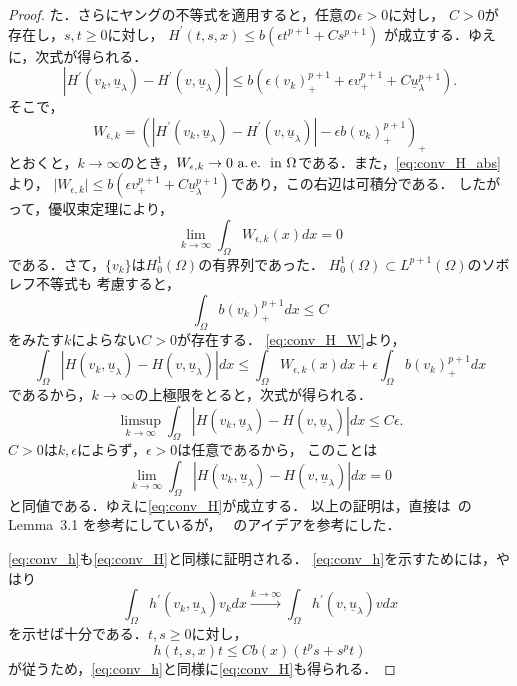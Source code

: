 \begin{proof}
 た．さらにヤングの不等式を適用すると，任意の$\epsilon > 0$に対し，
 $C > 0$が存在し，$s, t \geq 0$に対し，
 $H^\prime(t, s, x) \leq b( \epsilon t^{p+1} + C s^{p+1})$
 が成立する．ゆえに，次式が得られる．
 \begin{equation}
  \left\lvert H^\prime(v_k, \underline{u}_\lambda) - H^\prime(v,
   \underline{u}_\lambda ) \right\rvert \leq b \left( \epsilon
   (v_k)_+^{p+1}  + \epsilon v_+^{p+1} + C
   \underline{u}_\lambda^{p+1} \right). \label{eq:conv_H_abs}
 \end{equation}
 そこで，
 \begin{equation}
  W_{\epsilon, k} = \left( \left\lvert H^\prime(v_k,
                            \underline{u}_\lambda) - H^\prime(v,
                            \underline{u}_\lambda) \right\rvert
  -\epsilon b (v_k)_+^{p+1}
                    \right)_+ \label{eq:conv_H_W}
 \end{equation}
 とおくと，$k \to \infty$のとき，$W_{\epsilon, k} \to 0 ~\text{a.\,e.}~ ~\text{in}~
 \Omega$である．また，\eqref{eq:conv_H_abs}より，
 $\lvert W_{\epsilon, k} \rvert \leq b \left( \epsilon v_+^{p+1} + C
 \underline{u}_\lambda^{p+1} \right)$であり，この右辺は可積分である．
 したがって，優収束定理により，
 \[
  \lim_{k \to \infty} \int_\Omega  W_{\epsilon, k}(x) dx = 0
 \]
 である．さて，$\{v_k \}$は$H_0^1(\Omega)$の有界列であった．
 $H_0^1(\Omega) \subset L^{p+1}(\Omega)$のソボレフ不等式も
 考慮すると，
 \[
   \int_\Omega b ( v_k )_+^{p+1} dx \leq C
 \]
 をみたす$k$によらない$C > 0$が存在する．
 \eqref{eq:conv_H_W}より，
 \[
  \int_\Omega \left\lvert H(v_k, \underline{u}_\lambda) - H(v,
 \underline{u}_\lambda ) \right\rvert dx \leq \int_\Omega W_{\epsilon,
 k} (x)dx + \epsilon \int_\Omega b(v_k)_+^{p+1} dx
 \]
 であるから，$k \to \infty$の上極限をとると，次式が得られる．
 \[
 \limsup_{k \to \infty} \int_\Omega 
 \left\lvert H(v_k, \underline{u}_\lambda) - H(v,
 \underline{u}_\lambda ) \right\rvert dx \leq C \epsilon.
 \]
 $C > 0$は$k, \epsilon$によらず，$\epsilon > 0$は任意であるから，
 このことは
 \[
  \lim_{k \to \infty}
 \int_\Omega \left\lvert H(v_k, \underline{u}_\lambda) - H(v,
 \underline{u}_\lambda ) \right\rvert dx = 0
 \]
 と同値である．ゆえに\eqref{eq:conv_H}が成立する．
 以上の証明は，直接は~\cite{MR2886160}の Lemma~3.1 を参考にしているが，
 ~\cite{MR699419}のアイデアを参考にした．
 
 \eqref{eq:conv_h}も\eqref{eq:conv_H}と同様に証明される．
 \eqref{eq:conv_h}を示すためには，やはり
 \[
  \int_\Omega h^\prime(v_k, \underline{u}_\lambda) v_k dx
 \xrightarrow{k \to \infty} \int_\Omega h^\prime (v,
 \underline{u}_\lambda ) v dx 
 \]
 を示せば十分である．$t, s \geq 0$に対し，
 \[
  h(t, s, x) t \leq C b(x) (t^p s + s^p t)
 \]
 が従うため，\eqref{eq:conv_h}と同様に\eqref{eq:conv_H}も得られる．
 

\end{proof}
